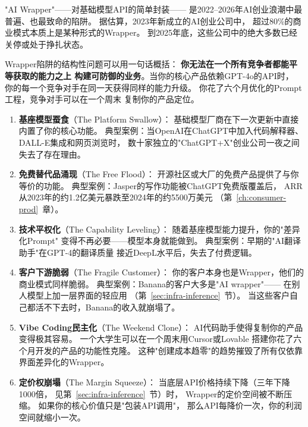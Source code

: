 "AI Wrapper"——对基础模型API的简单封装——
是2022--2026年AI创业浪潮中最普遍、也最致命的陷阱。
据估算，2023年新成立的AI创业公司中，
超过80\%的商业模式本质上是某种形式的Wrapper。
到2025年底，这些公司中的绝大多数已经关停或处于挣扎状态。

Wrapper陷阱的结构性问题可以用一句话概括：
\textbf{你无法在一个所有竞争者都能平等获取的能力之上
构建可防御的业务}。当你的核心产品依赖GPT-4o的API时，
你的每一个竞争对手在同一天获得同样的能力升级。
你花了六个月优化的Prompt工程，竞争对手可以在一个周末
复制你的产品定位。

\begin{warnbox}
\begin{enumerate}
  \item \textbf{基座模型蚕食}（The Platform Swallow）：
    基础模型厂商在下一次更新中直接内置了你的核心功能。
    典型案例：当OpenAI在ChatGPT中加入代码解释器、
    DALL-E集成和网页浏览时，
    数十家独立的"ChatGPT+X"创业公司一夜之间失去了存在理由。

  \item \textbf{免费替代品涌现}（The Free Flood）：
    开源社区或大厂的免费产品提供了与你等价的功能。
    典型案例：Jasper的写作功能被ChatGPT免费版覆盖后，
    ARR从2023年的约1.2亿美元暴跌至2024年的约5500万美元
    （第~\ref{ch:consumer-prod}~章）。

  \item \textbf{技术平权化}（The Capability Leveling）：
    随着基座模型能力提升，你的"差异化Prompt"
    变得不再必要——模型本身就能做到。
    典型案例：早期的"AI翻译助手"在GPT-4的翻译质量
    接近DeepL水平后，失去了付费逻辑。

  \item \textbf{客户下游脆弱}（The Fragile Customer）：
    你的客户本身也是Wrapper，他们的商业模式同样脆弱。
    典型案例：Banana的客户大多是"AI wrapper"——
    在别人模型上加一层界面的轻应用
    （第~\ref{sec:infra-inference}~节）。
    当这些客户自己都活不下去时，Banana的收入就崩塌了。

  \item \textbf{Vibe Coding民主化}（The Weekend Clone）：
    AI代码助手使得复制你的产品变得极其容易。
    一个大学生可以在一个周末用Cursor或Lovable
    搭建你花了六个月开发的产品的功能性克隆。
    这种"创建成本趋零"的趋势摧毁了所有仅依靠界面差异化的Wrapper。

  \item \textbf{定价权崩塌}（The Margin Squeeze）：
    当底层API价格持续下降（三年下降1000倍，
    见第~\ref{sec:infra-inference}~节）时，
    Wrapper的定价空间被不断压缩。
    如果你的核心价值只是"包装API调用"，
    那么API每降价一次，你的利润空间就缩小一次。
\end{enumerate}
\end{warnbox}

